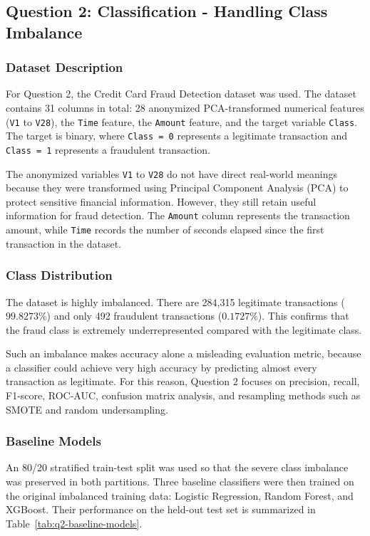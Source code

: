 \documentclass[11pt]{article}
\begin{document}
\subsection{Question 2: Classification - Handling Class Imbalance}

\subsubsection{Dataset Description}

For Question 2, the Credit Card Fraud Detection dataset was used. The dataset contains 31 columns in total: 28 anonymized PCA-transformed numerical features (\texttt{V1} to \texttt{V28}), the \texttt{Time} feature, the \texttt{Amount} feature, and the target variable \texttt{Class}. The target is binary, where \texttt{Class = 0} represents a legitimate transaction and \texttt{Class = 1} represents a fraudulent transaction.

The anonymized variables \texttt{V1} to \texttt{V28} do not have direct real-world meanings because they were transformed using Principal Component Analysis (PCA) to protect sensitive financial information. However, they still retain useful information for fraud detection. The \texttt{Amount} column represents the transaction amount, while \texttt{Time} records the number of seconds elapsed since the first transaction in the dataset.

\subsubsection{Class Distribution}

The dataset is highly imbalanced. There are 284,315 legitimate transactions (\(99.8273\%\)) and only 492 fraudulent transactions (\(0.1727\%\)). This confirms that the fraud class is extremely underrepresented compared with the legitimate class.

Such an imbalance makes accuracy alone a misleading evaluation metric, because a classifier could achieve very high accuracy by predicting almost every transaction as legitimate. For this reason, Question 2 focuses on precision, recall, F1-score, ROC-AUC, confusion matrix analysis, and resampling methods such as SMOTE and random undersampling.

\subsubsection{Baseline Models}

An 80/20 stratified train-test split was used so that the severe class imbalance was preserved in both partitions. Three baseline classifiers were then trained on the original imbalanced training data: Logistic Regression, Random Forest, and XGBoost. Their performance on the held-out test set is summarized in Table~\ref{tab:q2-baseline-models}.
\end{document}
